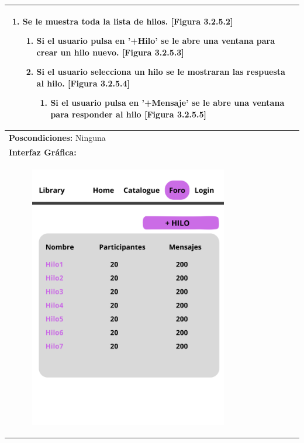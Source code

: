 ﻿\documentclass{report}
\begin{document}
\begin{center}
\begin{longtable}{|p{\linewidth}|}
\begin{enumerate}
\begin{enumerate}
                                \item Se le muestra toda la lista de hilos. [Figura 3.2.5.2]
                                \begin{enumerate}
                                    \item Si el usuario pulsa en '+Hilo' se le abre una ventana para crear un hilo nuevo. [Figura 3.2.5.3]
                                    \item Si el usuario selecciona un hilo se le mostraran las respuesta al hilo. [Figura 3.2.5.4]
                                    \begin{enumerate}
                                        \item Si el usuario pulsa en '+Mensaje' se le abre una ventana para responder al hilo [Figura 3.2.5.5]
                                    \end{enumerate}
                                \end{enumerate}
                            \end{enumerate}
                        \end{enumerate}\\
                        \hline
                        \textbf{Poscondiciones:} Ninguna\\
                        \hline
                        \textbf{Interfaz Gráfica:}\\
                        \begin{figure}[H]
                            \centering
                            \includegraphics[width=0.8\textwidth]{./img/grafico/Foro.png}

\end{figure}
\end{longtable}
\end{center}
\end{document}
